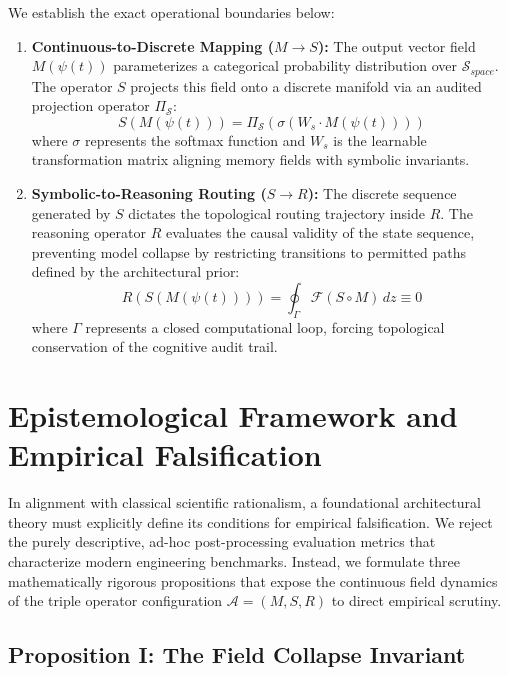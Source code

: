 We establish the exact operational boundaries below:
\begin{enumerate}
    \item \textbf{Continuous-to-Discrete Mapping ($M \to S$):} The output vector field $M(\psi(t))$ parameterizes a categorical probability distribution over $\mathcal{S}_{space}$. The operator $S$ projects this field onto a discrete manifold via an audited projection operator $\Pi_{\mathcal{S}}$:
    \begin{equation}
    S(M(\psi(t))) = \Pi_{\mathcal{S}} \left( \sigma \left( W_s \cdot M(\psi(t)) \right) \right)
    \end{equation}
    where $\sigma$ represents the softmax function and $W_s$ is the learnable transformation matrix aligning memory fields with symbolic invariants.
    
    \item \textbf{Symbolic-to-Reasoning Routing ($S \to R$):} The discrete sequence generated by $S$ dictates the topological routing trajectory inside $R$. The reasoning operator $R$ evaluates the causal validity of the state sequence, preventing model collapse by restricting transitions to permitted paths defined by the architectural prior:
    \begin{equation}
    R(S(M(\psi(t)))) = \oint_{\Gamma} \mathcal{F}\left(S \circ M\right) \, dz \equiv 0
    \end{equation}
    where $\Gamma$ represents a closed computational loop, forcing topological conservation of the cognitive audit trail.
\end{enumerate}

\section{Epistemological Framework and Empirical Falsification}

In alignment with classical scientific rationalism, a foundational architectural theory must explicitly define its conditions for empirical falsification. We reject the purely descriptive, ad-hoc post-processing evaluation metrics that characterize modern engineering benchmarks. Instead, we formulate three mathematically rigorous propositions that expose the continuous field dynamics of the triple operator configuration $\mathcal{A} = (M, S, R)$ to direct empirical scrutiny.

\subsection{Proposition I: The Field Collapse Invariant}

